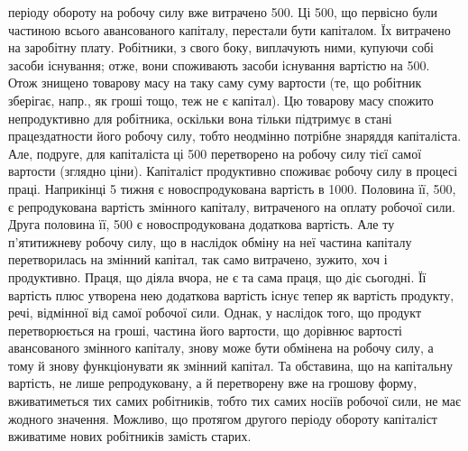 \parcont{}  %
періоду обороту на робочу силу вже витрачено 500. Ці 500,
що первісно були частиною всього авансованого капіталу, перестали бути
капіталом. Їх витрачено на заробітну плату. Робітники, з свого боку,
виплачують ними, купуючи собі засоби існування; отже, вони споживають
засоби існування вартістю на 500. Отож знищено товарову
масу на таку саму суму вартости (те, що робітник зберігає, напр., як
гроші тощо, теж не є капітал). Цю товарову масу спожито непродуктивно
для робітника, оскільки вона тільки підтримує в стані працездатности
його робочу силу, тобто неодмінно потрібне знаряддя капіталіста. Але,
подруге, для капіталіста ці 500 перетворено на робочу силу тієї
самої вартости (зглядно ціни). Капіталіст продуктивно споживає робочу
силу в процесі праці. Наприкінці 5 тижня є новоспродукована вартість
в 1000. Половина її, 500, є репродукована вартість змінного
капіталу, витраченого на оплату робочої сили. Друга половина її,
500 є новоспродукована додаткова вартість. Але ту п’ятитижневу
робочу силу, що в наслідок обміну на неї частина капіталу перетворилась
на змінний капітал, так само витрачено, зужито, хоч і продуктивно.
Праця, що діяла вчора, не є та сама праця, що діє сьогодні. Її
вартість плюс утворена нею додаткова вартість існує тепер як вартість
продукту, речі, відмінної від самої робочої сили. Однак, у наслідок того,
що продукт перетворюється на гроші, частина його вартости, що дорівнює
вартості авансованого змінного капіталу, знову може бути
обмінена на робочу силу, а тому й знову функціонувати як змінний капітал.
Та обставина, що на капітальну вартість, не лише репродуковану,
а й перетворену вже на грошову форму, вживатиметься тих самих робітників,
тобто тих самих носіїв робочої сили, не має жодного значення.
Можливо, що протягом другого періоду обороту капіталіст вживатиме
нових робітників замість старих.

